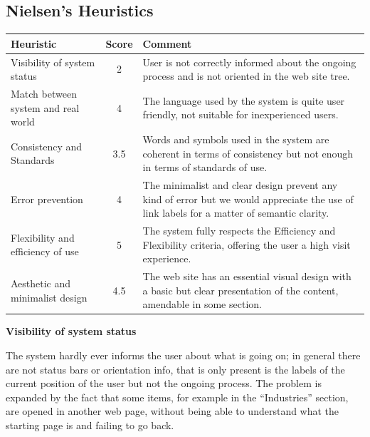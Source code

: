 \subsection{Nielsen's Heuristics}
\begin{table}[H]
  \begin{center}
    \label{tab:table1}
    \begin{tabular}{||l|c|p{8cm}||} %
      \textbf{Heuristic} & \textbf{Score} & \textbf{Comment}\\
      
      \hline
      Visibility of system status & 2 & User is not correctly informed about the ongoing process and is not oriented in the web site tree.\\
      \hline
      Match between system and real world & 4 & The language used by the system is quite user friendly, not suitable for inexperienced users.\\
      \hline
      Consistency and Standards & 3.5 & Words and symbols used in the system are coherent in terms of consistency but not enough in terms of standards of use.\\
      \hline
      Error prevention & 4 & The minimalist and clear design prevent any kind of error but we would appreciate the use of link labels for a matter of semantic clarity.\\
      \hline
      Flexibility and efficiency of use & 5 & The system fully respects the Efficiency and Flexibility criteria, offering the user a high visit experience.\\
      \hline
      Aesthetic and minimalist design & 4.5 & The web site has an essential visual design with a basic but clear presentation of the content, amendable in some section.\\
    \end{tabular}
  \end{center}
\end{table}

\medskip

\textbf{Visibility of system status }\par
The system hardly ever informs the user about what is going on; in general there are not status bars or orientation info, that is only present is the labels of the current position of the user but not the ongoing process. The problem is expanded by the fact that some items, for example in the “Industries” section, are opened in another web page, without being able to understand what the starting page is and failing to go back.  
\medskip

